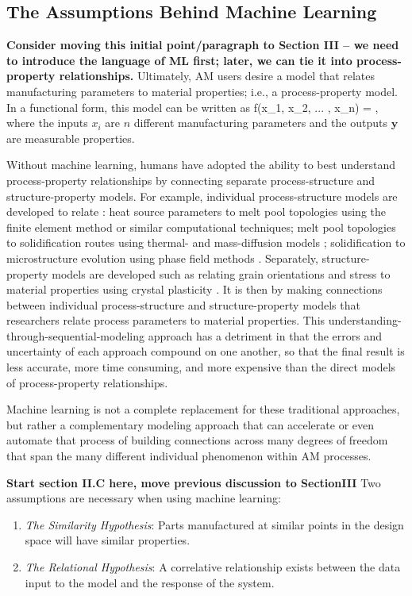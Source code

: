 \subsection{The Assumptions Behind Machine Learning}
\textbf{Consider moving this initial point/paragraph to Section III -- we need to introduce the language of ML first; later, we can tie it into process-property relationships.} Ultimately, AM users desire a model that relates manufacturing parameters to material properties; i.e., a process-property model. In a functional form, this model can be written as
\eqn
f(x_1, x_2, ... , x_n) = ,
\label{fundamentalgoal}
\equ
where the inputs $x_i$ are $n$ different manufacturing parameters and the outputs $\mathbf{y}$ are measurable properties.

Without machine learning, humans have adopted the ability to best understand process-property relationships by connecting separate process-structure and structure-property models. For example, individual process-structure models are developed to relate : heat source parameters to melt pool topologies \cite{Khairallah2016} using the finite element method or similar computational techniques; melt pool topologies to solidification routes using thermal- and mass-diffusion models  \cite{Tan2011}; solidification to microstructure evolution using phase field methods \cite{Kundin2015}. Separately, structure-property models are developed such as relating grain orientations and stress to material properties using crystal plasticity \cite{Pal2014}. It is then by making connections between individual process-structure and structure-property models that researchers relate process parameters to material properties. This understanding-through-sequential-modeling approach has a detriment in that the errors and uncertainty of each approach compound on one another, so that the final result is less accurate, more time consuming, and more expensive than the direct models of process-property relationships.

Machine learning is not a complete replacement for these traditional approaches, but rather a complementary modeling approach that can accelerate or even automate that process of building connections across many degrees of freedom that span the many different individual phenomenon within AM processes.

\textbf{Start section II.C here, move previous discussion to SectionIII}
Two assumptions are necessary when using machine learning:
\begin{enumerate}
\item \textit{The Similarity Hypothesis}: Parts manufactured at similar points in the design space will have similar properties.
\item \textit{The Relational Hypothesis}: A correlative relationship exists between the data input to the model and the response of the system.
\end{enumerate}

